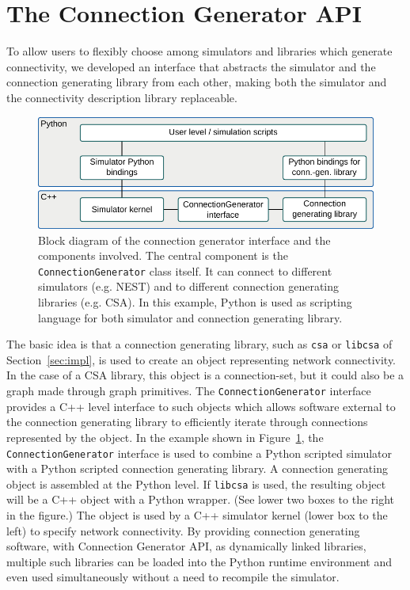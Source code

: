 \documentclass{frontiersSCNS} %
\newcommand{\INLINEFIGS}{} %
\newcommand{\Figure}[2]{Figure~\ref{#2}}
\newcommand{\Figure}[2]{Figure~#1}
\begin{document}

\section{The Connection Generator API}

To allow users to flexibly choose among simulators and libraries which
generate connectivity, we developed an interface that abstracts the
simulator and the connection generating library from each other,
making both the simulator and the connectivity description library
replaceable.

\ifdefined\INLINEFIGS
\begin{figure}[ht]
\centering
\includegraphics[scale=.8]{figures/block_diagram_conngen.pdf}
\caption{Block diagram of the connection generator interface and the
  components involved. The central component is the
  \texttt{ConnectionGenerator} class itself. It can connect to different
  simulators (e.g. NEST) and to different connection generating
  libraries (e.g. CSA). In this example, Python is used as scripting
  language for both simulator and connection generating
  library.}\label{fig:block_diagram_conngen}
\end{figure}
\fi

The basic idea is that a connection generating library, such as
\verb|csa| or \verb|libcsa| of Section~\ref{sec:impl}, is used to
create an object representing network connectivity.  In the case of a
CSA library, this object is a connection-set, but it could also be a
graph made through graph primitives. The \verb|ConnectionGenerator| interface
provides a C++ level interface to such objects which allows software
external to the connection generating library to efficiently iterate
through connections represented by the object.  In the example shown
in \Figure{2}{fig:block_diagram_conngen}, the \verb|ConnectionGenerator|
interface is used to combine a Python scripted simulator with a Python
scripted connection generating library. A connection generating object
is assembled at the Python level.  If \verb|libcsa| is used, the
resulting object will be a C++ object with a Python wrapper. (See
lower two boxes to the right in the figure.) The object is used by a
C++ simulator kernel (lower box to the left) to specify network
connectivity. By providing connection generating software, with
Connection Generator API, as dynamically linked libraries, multiple
such libraries can be loaded into the Python runtime environment and
even used simultaneously without a need to recompile the simulator.
\end{document}
